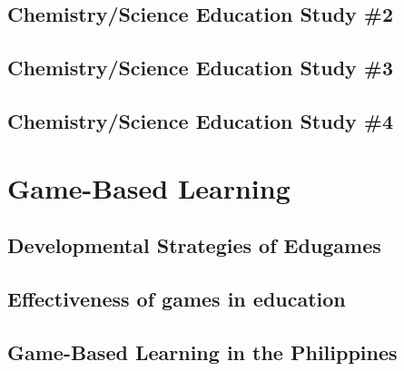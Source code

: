 
\subsection{Chemistry/Science Education Study \#2}


\subsection{Chemistry/Science Education Study \#3}


\subsection{Chemistry/Science Education Study \#4}



\section{Game-Based Learning}

\subsection{Developmental Strategies of Edugames}


\subsection{Effectiveness of games in education}


\subsection{Game-Based Learning in the Philippines}

